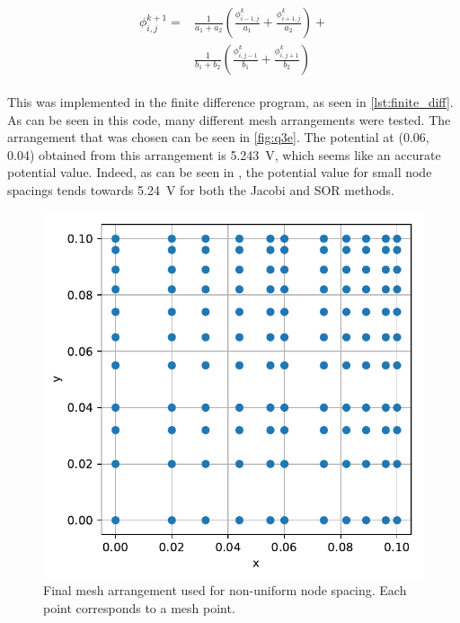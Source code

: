 \documentclass[a4paper,titlepage]{article}
\begin{document}
	\begin{align} \label{eq:non_uniform}
		\begin{split}
			\phi^{k + 1}_{i,j} = 
			&\frac{1}{a_1 + a_2}\left(\frac{\phi^k_{i - 1,j}}{a_1} + \frac{\phi^k_{i + 1,j}}{a_2}\right) + \\
			&\frac{1}{b_1 + b_2}\left(\frac{\phi^k_{i, j - 1}}{b_1} + \frac{\phi^k_{i, j + 1}}{b_2}\right)
		\end{split}
	\end{align}
	
	This was implemented in the finite difference program, as seen in \autoref{lst:finite_diff}. As can be seen in this code, many different mesh arrangements were tested. The arrangement that was chosen can be seen in \autoref{fig:q3e}. The potential at (0.06, 0.04) obtained from this arrangement is \SI{5.243}{\volt}, which seems like an accurate potential value. Indeed, as can be seen in , the potential value for small node spacings tends towards \SI{5.24}{\volt} for both the Jacobi and SOR methods.
	
	\begin{figure}[!htb]
		\centering
		\includegraphics[width=\columnwidth]{plots/q3e.pdf}
		\caption
		{Final mesh arrangement used for non-uniform node spacing. Each point corresponds to a mesh point.}
		\label{fig:q3e}
	\end{figure}
	
\end{document}
